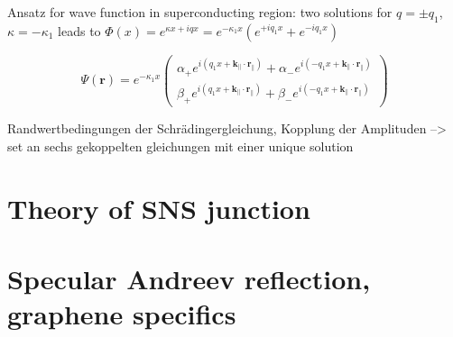 Ansatz for wave function in superconducting region: two solutions for $q = \pm q_1$, $\kappa = - \kappa_1$ leads to $\Phi \left( x \right) = e^{\kappa x + i q x} = e^{-\kappa_1 x } \left( e^{+i q_1 x} + e^{- i q_1 x} \right)$

\begin{equation}
\Psi \left( \mathbf{r} \right) = e^{- \kappa_1 x }  \begin{pmatrix} \alpha_+ e^{i ( q_1x + \mathbf{k}_\parallel \cdot \mathbf{r}_\parallel)} + \alpha_- e^{i ( - q_1x + \mathbf{k}_\parallel \cdot \mathbf{r}_\parallel)}\\ \beta_+ e^{i ( q_1x + \mathbf{k}_\parallel \cdot \mathbf{r}_\parallel)} + \beta_-e^{i ( - q_1x + \mathbf{k}_\parallel \cdot \mathbf{r}_\parallel)} \end{pmatrix}
\end{equation}

Randwertbedingungen der Schrädingergleichung, Kopplung der Amplituden --> set an sechs gekoppelten gleichungen mit einer unique solution


\section{Theory of SNS junction}

\section{Specular Andreev reflection, graphene specifics}

